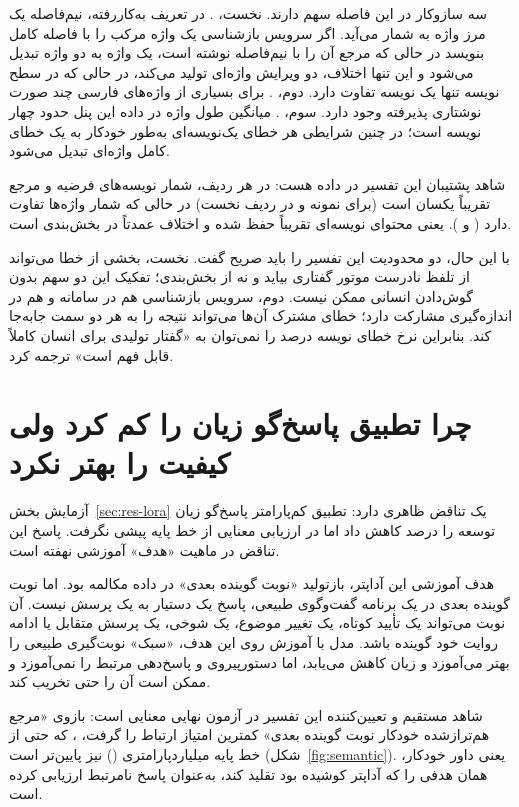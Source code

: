 سه سازوکار در این فاصله سهم دارند. نخست، . در
تعریف به‌کاررفته، نیم‌فاصله یک مرز واژه به شمار می‌آید. اگر سرویس بازشناسی
یک واژه مرکب را با فاصله کامل بنویسد در حالی که مرجع آن را با نیم‌فاصله
نوشته است، یک واژه به دو واژه تبدیل می‌شود و این تنها اختلاف، دو ویرایش
واژه‌ای تولید می‌کند، در حالی که در سطح نویسه تنها یک نویسه تفاوت دارد.
دوم، . برای بسیاری از واژه‌های فارسی چند
صورت نوشتاری پذیرفته وجود دارد. سوم، . میانگین طول واژه در
داده این پنل حدود چهار نویسه است؛ در چنین شرایطی هر خطای یک‌نویسه‌ای
به‌طور خودکار به یک خطای کامل واژه‌ای تبدیل می‌شود.

شاهد پشتیبان این تفسیر در داده هست: در هر  ردیف، شمار نویسه‌های فرضیه و
مرجع تقریباً یکسان است (برای نمونه  و  در ردیف نخست) در حالی
که شمار واژه‌ها تفاوت دارد ( و ). یعنی محتوای نویسه‌ای تقریباً
حفظ شده و اختلاف عمدتاً در بخش‌بندی است.

با این حال، دو محدودیت این تفسیر را باید صریح گفت. نخست، بخشی از خطا
می‌تواند از تلفظ نادرست موتور گفتاری بیاید و نه از بخش‌بندی؛ تفکیک این دو
سهم بدون گوش‌دادن انسانی ممکن نیست. دوم، سرویس بازشناسی هم در سامانه و هم
در اندازه‌گیری مشارکت دارد؛ خطای مشترک آن‌ها می‌تواند نتیجه را به هر دو
سمت جابه‌جا کند. بنابراین نرخ خطای نویسه  درصد را نمی‌توان به
«گفتار تولیدی برای انسان کاملاً قابل فهم است» ترجمه کرد.

\section{چرا تطبیق پاسخ‌گو زیان را کم کرد ولی کیفیت را بهتر نکرد}
\label{sec:disc-reference}

آزمایش بخش~\ref{sec:res-lora} یک تناقض ظاهری دارد: تطبیق کم‌پارامتر
پاسخ‌گو زیان توسعه را  درصد کاهش داد اما در ارزیابی معنایی از خط
پایه پیشی نگرفت. پاسخ این تناقض در ماهیت «هدف» آموزشی نهفته است.

هدف آموزشی این آداپتر، بازتولید «نوبت گوینده بعدی» در داده مکالمه بود.
اما نوبت گوینده بعدی در یک برنامه گفت‌وگوی طبیعی، پاسخ یک دستیار به یک
پرسش نیست. آن نوبت می‌تواند یک تأیید کوتاه، یک تغییر موضوع، یک شوخی، یک
پرسش متقابل یا ادامه روایت خود گوینده باشد. مدل با آموزش روی این هدف،
«سبک» نوبت‌گیری طبیعی را بهتر می‌آموزد و زیان کاهش می‌یابد، اما
دستور‌پیروی و پاسخ‌دهی مرتبط را نمی‌آموزد و ممکن است آن را حتی تخریب
کند.

شاهد مستقیم و تعیین‌کننده این تفسیر در آزمون نهایی معنایی است: بازوی
«مرجع هم‌ترازشده خودکار نوبت گوینده بعدی» کمترین امتیاز ارتباط را گرفت،
، که حتی از خط پایه  میلیارد‌پارامتری () نیز
پایین‌تر است (شکل~\ref{fig:semantic}). یعنی داور خودکار، همان هدفی را که
آداپتر کوشیده بود تقلید کند، به‌عنوان پاسخ نامرتبط ارزیابی کرده است.

